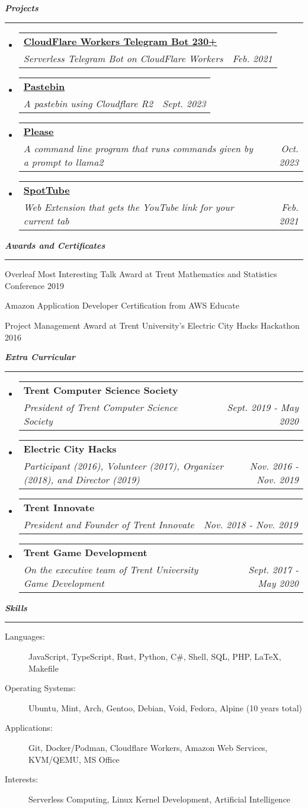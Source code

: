 \documentclass[letterpaper,11pt]{article}
\makeatletter
\newcommand{\mysection}[1]{\vspace{5pt} {\bfseries \textsl{#1}} \\ {\color{gray} \rule[5pt]{\textwidth}{1pt}}}
\newcommand{\ressubheading}[4]{\begin{tabular*}{6.7in}{l@{\extracolsep{\fill}}r}
        \textbf{#1} & #2 \\
        \textit{#3} & \textit{#4} \\
\end{tabular*}\vspace{-6pt}}
\makeatother
\begin{document}
\mysection{Projects}
\begin{itemize}
    \item
        \ressubheading{\faIcon{github} \href{https://github.com/codebam/cf-workers-telegram-bot}{CloudFlare Workers Telegram Bot \faIcon{star} 230+}}{}{Serverless Telegram Bot on CloudFlare Workers}{Feb. 2021}
    \item
        \ressubheading{\faIcon{github} \href{https://github.com/codebam/pastebin-r2}{Pastebin}}{}{A pastebin using Cloudflare R2}{Sept. 2023}
    \item
        \ressubheading{\faIcon{github} \href{https://github.com/codebam/please}{Please}}{}{A command line program that runs commands given by a prompt to llama2}{Oct. 2023}
    \item
        \ressubheading{\faIcon{github} \href{https://github.com/codebam/spottube}{SpotTube}}{}{Web Extension that gets the YouTube link for your current tab}{Feb. 2021}
\end{itemize}

\mysection{Awards and Certificates}
\begin{description}
    \item Overleaf Most Interesting Talk Award at Trent Mathematics and Statistics Conference 2019
    \item Amazon Application Developer Certification from AWS Educate
    \item Project Management Award at Trent University's Electric City Hacks Hackathon 2016
\end{description}

\mysection{Extra Curricular}
\begin{itemize}
    \item
        \ressubheading{Trent Computer Science Society}{}{President of Trent Computer Science Society}{Sept. 2019 - May 2020}
    \item
        \ressubheading{Electric City Hacks}{}{Participant (2016), Volunteer
            (2017), Organizer (2018), and Director (2019)}{Nov. 2016 - Nov. 2019}
    \item
        \ressubheading{Trent Innovate}{}{President and Founder of Trent Innovate}{Nov. 2018 - Nov. 2019}
    \item
        \ressubheading{Trent Game Development}{}{On the executive team of Trent University Game Development}{Sept. 2017 - May 2020}
\end{itemize}

\mysection{Skills}
\begin{description}
    \item[Languages:]
        JavaScript, TypeScript, Rust, Python, C\#, Shell, SQL, PHP, \LaTeX{}, Makefile
    \item[Operating Systems:]
        Ubuntu, Mint, Arch, Gentoo, Debian, Void, Fedora, Alpine (10 years total)
    \item[Applications:]
        Git, Docker/Podman, Cloudflare Workers, Amazon Web Services, KVM/QEMU, MS Office
    \item[Interests:]
        Serverless Computing, Linux Kernel Development, Artificial Intelligence
\end{description}
\end{document}
